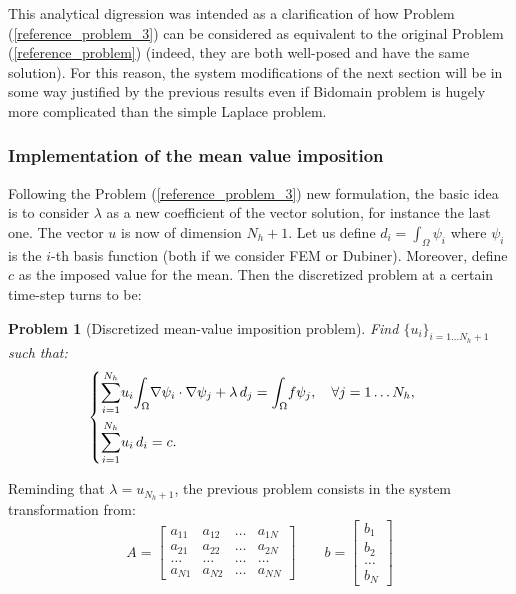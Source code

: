 \documentclass[a4paper,11pt]{article}
\newtheorem{problem}{Problem}
\begin{document}
	\vspace{3mm} 
	\noindent This analytical digression was intended as a clarification of how Problem (\ref{reference_problem_3}) can be considered as equivalent to the original Problem (\ref{reference_problem}) (indeed, they are both well-posed and have the same solution). For this reason, the system modifications of the next section will be in some way justified by the previous results even if Bidomain problem is hugely more complicated than the simple Laplace problem.


\subsubsection{Implementation of the mean value imposition} \label{mean_value_implementation}
\noindent Following the Problem (\ref{reference_problem_3}) new formulation, the basic idea is to consider $\lambda$ as a new coefficient of the vector solution, for instance the last one. The vector $u$ is now of dimension $N_h+1$. Let us define $d_i=\int_\Omega \psi_i$ where $\psi_i$ is the $i$-th basis function (both if we consider FEM or Dubiner). Moreover, define $c$ as the imposed value for the mean. Then the discretized problem at a certain time-step turns to be:

\begin{problem}[Discretized mean-value imposition problem]
	Find $\{u_i\}_{i=1\dots N_h+1}$ such that:
	\begin{equation*}
	\begin{cases}
	\mathlarger{\sum}_{i=1}^{N_h} u_i \mathlarger{\int}_{\Omega}\nabla\psi_i \cdot \nabla \psi_j + \lambda \,d_j=\mathlarger{\int}_{\Omega}f\psi_j, \quad \forall j=1\dots N_h, \\[3ex]
	\mathlarger{\sum}_{i=1}^{N_h} u_i \,d_i = c.
	\end{cases}
	\end{equation*}
\end{problem}
\vspace{3mm}
\noindent Reminding that $\lambda=u_{N_h+1}$, the previous problem consists in the system transformation from: \\
\begin{equation*}
A=\begin{bmatrix}
a_{11} & a_{12} & \dots & a_{1N} \\ 
a_{21} & a_{22} & \dots & a_{2N} \\ 
\dots & \dots & \dots & \dots \\
a_{N1}  & a_{N2} & \dots & a_{NN}
\end{bmatrix} \quad \quad
b=\begin{bmatrix}
b_1 \\ b_2 \\ \dots \\ b_N
\end{bmatrix}
\end{equation*}
\end{document}
